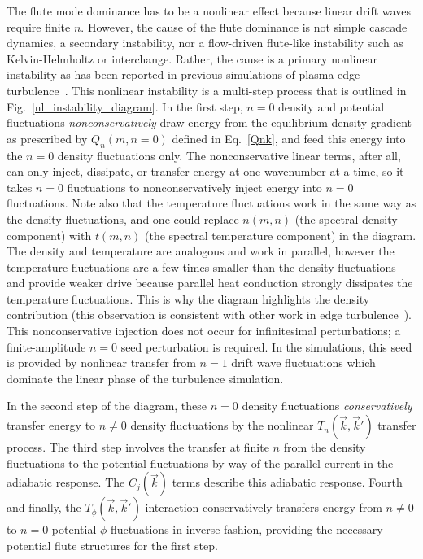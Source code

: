 \documentclass[showpacs,preprintnumbers,amsmath,amssymb,superscriptaddress,aip]{revtex4-1}
\begin{document}
The flute mode dominance has to be a nonlinear effect because linear drift waves require finite $n$. However, the cause of the flute dominance is not simple cascade dynamics, a secondary 
instability, nor a flow-driven flute-like instability such as
Kelvin-Helmholtz or interchange. Rather, the cause is a primary
nonlinear instability as has been reported in previous simulations of
plasma edge turbulence~\cite{biskamp1995,drake1995}. 
This nonlinear instability is a multi-step process that is outlined in Fig.~\ref{nl_instability_diagram}.
In the first step, $n=0$ density and potential fluctuations \emph{nonconservatively} draw energy from the equilibrium density gradient as prescribed 
by $Q_n(m,n=0)$ defined in Eq.~\ref{Qnk}, and feed
this energy into the $n=0$ density fluctuations only. The nonconservative linear terms, after all, can only inject, dissipate, or transfer energy at one wavenumber at a time, so it takes
$n=0$ fluctuations to nonconservatively inject energy into $n=0$
fluctuations. Note also that the temperature fluctuations work in the same way as the density fluctuations, and one could replace $n(m,n)$ (the spectral density component)
with $t(m,n)$ (the spectral temperature component) in the diagram. The density and temperature are analogous and work in parallel, however the temperature fluctuations are a few times smaller
than the density fluctuations and provide weaker drive because
parallel heat conduction strongly dissipates the temperature
fluctuations. This is why the diagram highlights the density
contribution (this observation is consistent with other work in edge turbulence~\cite{zeiler1997}).
 This nonconservative injection does not occur for
infinitesimal perturbations; a finite-amplitude $n=0$ seed
perturbation is required.  In the simulations, this seed is provided
by nonlinear transfer from $n=1$ drift wave fluctuations which
dominate the linear phase of the turbulence simulation.

In the second step of the diagram, these $n=0$ density fluctuations
\emph{conservatively} transfer energy to $n \ne 0$ density fluctuations by the nonlinear $T_n(\vec{k},\vec{k}')$ transfer process. 
The third step involves the transfer at finite $n$ from the density
fluctuations to the potential fluctuations by way of the parallel current in the adiabatic response. The $C_j(\vec{k})$ terms describe this adiabatic response.
Fourth and finally, the $T_\phi(\vec{k},\vec{k}')$ interaction conservatively transfers energy from
$n \ne 0$ to $n=0$ potential $\phi$ fluctuations in inverse fashion, providing the necessary potential flute structures for the first step.
\end{document}

